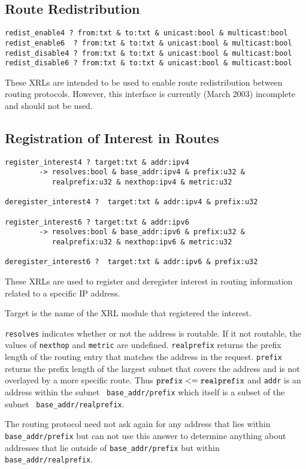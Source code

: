 \documentclass[11pt]{article}
\begin{document}
\subsection{Route Redistribution}
\begin{verbatim}
redist_enable4 ? from:txt & to:txt & unicast:bool & multicast:bool
redist_enable6  ? from:txt & to:txt & unicast:bool & multicast:bool
redist_disable4 ? from:txt & to:txt & unicast:bool & multicast:bool
redist_disable6 ? from:txt & to:txt & unicast:bool & multicast:bool
\end{verbatim}
These XRLs are intended to be used to enable route redistribution
between routing protocols.  However, this interface is currently
(March 2003) incomplete and should not be used.

\subsection{Registration of Interest in Routes}
\label{reg}
\begin{verbatim}
register_interest4 ? target:txt & addr:ipv4 
        -> resolves:bool & base_addr:ipv4 & prefix:u32 & 
           realprefix:u32 & nexthop:ipv4 & metric:u32

deregister_interest4 ?  target:txt & addr:ipv4 & prefix:u32

register_interest6 ? target:txt & addr:ipv6 
        -> resolves:bool & base_addr:ipv6 & prefix:u32 & 
           realprefix:u32 & nexthop:ipv6 & metric:u32

deregister_interest6 ?  target:txt & addr:ipv6 & prefix:u32
\end{verbatim}
These XRLs are used to register and deregister interest in routing
information related to a specific IP address. 

Target is the name of the XRL module that registered the interest.

{\tt resolves} indicates whether or not the address is routable.  If
it not routable, the values of {\tt nexthop} and {\tt metric} are
undefined.  {\tt realprefix} returns the prefix length of the routing
entry that matches the address in the request.  {\tt prefix} returns
the prefix length of the largest subnet that covers the address and is
not overlayed by a more specific route.  Thus ${\tt prefix} <= {\tt
realprefix}$ and {\tt addr} is an address within the subnet {\tt
base\_addr/prefix} which itself is a subset of the subnet {\tt
base\_addr/realprefix}.  

The routing protocol need not ask again for any address that lies
within {\tt base\_addr/prefix} but can not use this answer to determine
anything about addresses that lie outside of {\tt base\_addr/prefix}
but within {\tt base\_addr/realprefix}.
\end{document}

